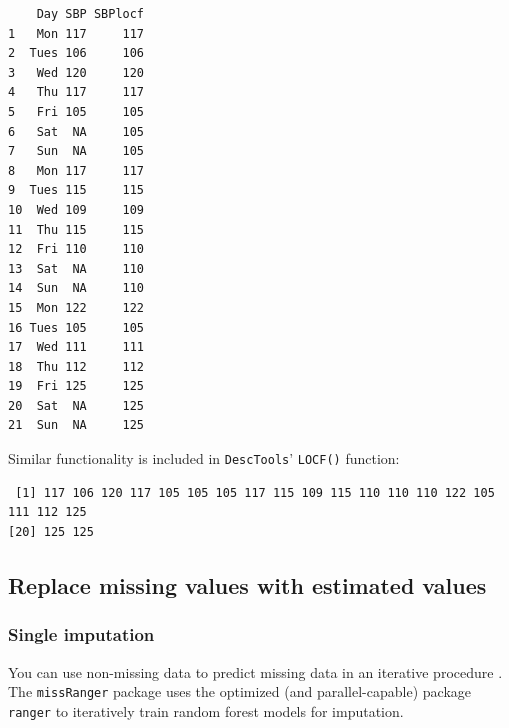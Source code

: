 \documentclass[
]{book}
\newenvironment{Shaded}{\begin{snugshade}}{\end{snugshade}}
\newcommand{\FunctionTok}[1]{\textcolor[rgb]{0.00,0.00,0.00}{#1}}
\newcommand{\NormalTok}[1]{#1}
\newcommand{\OtherTok}[1]{\textcolor[rgb]{0.56,0.35,0.01}{#1}}
\newcommand{\SpecialCharTok}[1]{\textcolor[rgb]{0.00,0.00,0.00}{#1}}
\begin{document}
\begin{Shaded}
\end{Shaded}

\begin{verbatim}
    Day SBP SBPlocf
1   Mon 117     117
2  Tues 106     106
3   Wed 120     120
4   Thu 117     117
5   Fri 105     105
6   Sat  NA     105
7   Sun  NA     105
8   Mon 117     117
9  Tues 115     115
10  Wed 109     109
11  Thu 115     115
12  Fri 110     110
13  Sat  NA     110
14  Sun  NA     110
15  Mon 122     122
16 Tues 105     105
17  Wed 111     111
18  Thu 112     112
19  Fri 125     125
20  Sat  NA     125
21  Sun  NA     125
\end{verbatim}

Similar functionality is included in \texttt{DescTools}' \texttt{LOCF()} function:

\begin{Shaded}
\end{Shaded}

\begin{verbatim}
 [1] 117 106 120 117 105 105 105 117 115 109 115 110 110 110 122 105 111 112 125
[20] 125 125
\end{verbatim}

\hypertarget{replace-missing-values-with-estimated-values}{%
\subsection{Replace missing values with estimated values}\label{replace-missing-values-with-estimated-values}}

\hypertarget{single-imputation}{%
\subsubsection{Single imputation}\label{single-imputation}}

You can use non-missing data to predict missing data in an iterative procedure \citep{buuren2010mice}\citep{stekhoven2012missforest}.
The \texttt{missRanger} package uses the optimized (and parallel-capable) package \texttt{ranger} \citep{wright2015ranger} to iteratively train random forest models for imputation.
\end{document}
